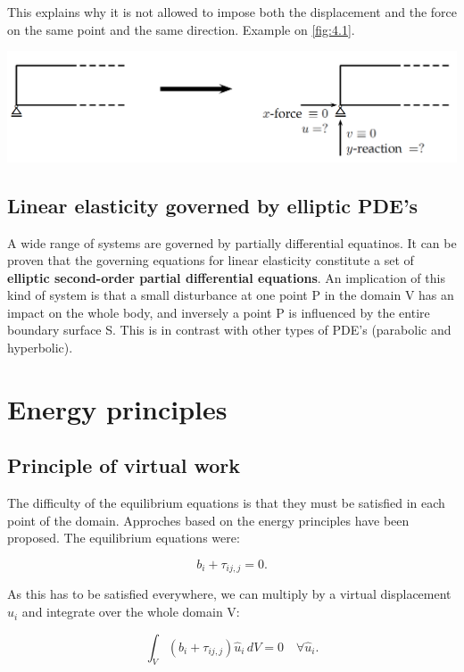 	This explains why it is not allowed to impose both the displacement and the force on the same point and the same direction. Example on \autoref{fig:4.1}. 
	
	\begin{center}
	\includegraphics[scale=0.3]{ch4/1}
	\label{fig:4.1}
	\end{center}
	
\subsection{Linear elasticity governed by elliptic PDE's}
	A wide range of systems are governed by partially differential equatinos. It can be proven that the governing equations for linear elasticity constitute a set of \textbf{elliptic second-order partial differential equations}. An implication of this kind of system is that a small disturbance at one point P in the domain V has an impact on the whole body, and inversely a point P is influenced by the entire boundary surface S. This is in contrast with other types of PDE's (parabolic and hyperbolic). 
	
\section{Energy principles}
\subsection{Principle of virtual work}
	The difficulty of the equilibrium equations is that they must be satisfied in each point of the domain. Approches based on the energy principles have been proposed. The equilibrium equations were: 
	
	\begin{equation}
	b_i + \tau _{ij,j} = 0.
	\end{equation}
	
	As this has to be satisfied everywhere, we can multiply by a virtual displacement $\hat{u}_i$ and integrate over the whole domain V:
	
	\begin{equation}
	\int _V (b_i + \tau _{ij,j}) \hat{u}_i \, dV= 0 \quad \forall \hat{u}_i.
	\end{equation}
	
